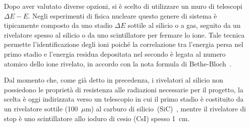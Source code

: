 Dopo aver valutato diverse opzioni, si è scelto di utilizzare un muro di telescopi $ \Delta E - E $.
Negli esperimenti di fisica nucleare questo genere di sistema è tipicamente composto da uno stadio $\Delta E$ sottile al silicio o a gas, seguito da un rivelatore spesso al silicio o da uno scintillatore per fermare lo ione.
Tale tecnica permette l'identificazione degli ioni poiché la correlazione tra l'energia persa nel primo stadio e l'energia residua depositata nel secondo è legata al numero atomico dello ione rivelato, in accordo con la nota formula di Bethe-Bloch~\cite{knoll:10}.

Dal momento che, come già detto in precedenza, i rivelatori al silicio non possiedono le proprietà di resistenza alle radiazioni necessarie per il progetto, la scelta è oggi indirizzata verso un telescopio in cui il primo stadio è costituito da un rivelatore sottile (100~$\mu $m) al carburo di silicio~(SiC)~\cite{tudisco:sensors18}, mentre il rivelatore di stop è uno scintillatore allo ioduro di cesio (CsI) spesso 1~cm.


